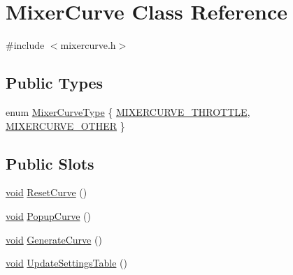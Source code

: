 \hypertarget{class_mixer_curve}{\section{\-Mixer\-Curve \-Class \-Reference}
\label{class_mixer_curve}
}


{\ttfamily \#include $<$mixercurve.\-h$>$}

\subsection*{\-Public \-Types}
\begin{DoxyCompactItemize}
\item 
enum \hyperlink{group___config_plugin_ga58a5506035df5fabbf4feffb36632595}{\-Mixer\-Curve\-Type} \{ \hyperlink{group___config_plugin_gga58a5506035df5fabbf4feffb36632595a7dbbc543ccc2e9b4f8ba98d66717a836}{\-M\-I\-X\-E\-R\-C\-U\-R\-V\-E\-\_\-\-T\-H\-R\-O\-T\-T\-L\-E}, 
\hyperlink{group___config_plugin_gga58a5506035df5fabbf4feffb36632595adc44b10adb428e4fdde5f964bbc339b8}{\-M\-I\-X\-E\-R\-C\-U\-R\-V\-E\-\_\-\-O\-T\-H\-E\-R}
 \}
\end{DoxyCompactItemize}
\subsection*{\-Public \-Slots}
\begin{DoxyCompactItemize}
\item 
\hyperlink{group___u_a_v_objects_plugin_ga444cf2ff3f0ecbe028adce838d373f5c}{void} \hyperlink{group___config_plugin_ga73b9d64b4c71bd3de1266b66707f8e3a}{\-Reset\-Curve} ()
\item 
\hyperlink{group___u_a_v_objects_plugin_ga444cf2ff3f0ecbe028adce838d373f5c}{void} \hyperlink{group___config_plugin_gaec9845f3048d0bb15ba6b31f4659888f}{\-Popup\-Curve} ()
\item 
\hyperlink{group___u_a_v_objects_plugin_ga444cf2ff3f0ecbe028adce838d373f5c}{void} \hyperlink{group___config_plugin_gad1f7dbb9fdd65436b5886e20fa930d27}{\-Generate\-Curve} ()
\item 
\hyperlink{group___u_a_v_objects_plugin_ga444cf2ff3f0ecbe028adce838d373f5c}{void} \hyperlink{group___config_plugin_gad4cb5385cbf5e389acf3fd394601df07}{\-Update\-Settings\-Table} ()
\end{DoxyCompactItemize}
